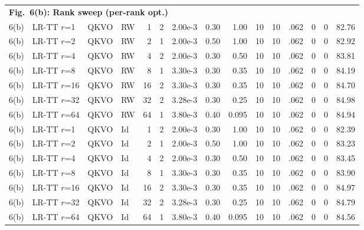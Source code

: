 \documentclass[AMA,LATO1COL]{WileyNJDv5}
\begin{document}
{\begin{longtable}{@{}l l l l r r r r r r r r r r r@{}}
\multicolumn{15}{l}{\cellcolor{HeadGray}\textbf{Fig.~6(b): Rank sweep (per-rank opt.)}} \\
6(b) & LR-TT $r$=1 & QKVO & RW & 1 & 2 & 2.00e-3 & 0.30 & 1.00 & 10 & 10 & .062 & 0 & 0 & 82.76 \\
6(b) & LR-TT $r$=2 & QKVO & RW & 2 & 1 & 2.00e-3 & 0.50 & 1.00 & 10 & 10 & .062 & 0 & 0 & 82.92 \\
6(b) & LR-TT $r$=4 & QKVO & RW & 4 & 2 & 2.00e-3 & 0.30 & 0.50 & 10 & 10 & .062 & 0 & 0 & 83.81 \\
6(b) & LR-TT $r$=8 & QKVO & RW & 8 & 1 & 3.30e-3 & 0.30 & 0.35 & 10 & 10 & .062 & 0 & 0 & 84.19 \\
6(b) & LR-TT $r$=16 & QKVO & RW & 16 & 2 & 3.30e-3 & 0.30 & 0.35 & 10 & 10 & .062 & 0 & 0 & 84.70 \\
6(b) & LR-TT $r$=32 & QKVO & RW & 32 & 2 & 3.28e-3 & 0.30 & 0.25 & 10 & 10 & .062 & 0 & 0 & 84.98 \\
6(b) & LR-TT $r$=64 & QKVO & RW & 64 & 1 & 3.80e-3 & 0.40 & 0.095 & 10 & 10 & .062 & 0 & 0 & 84.94 \\
6(b) & LR-TT $r$=1 & QKVO & Id & 1 & 2 & 2.00e-3 & 0.30 & 1.00 & 10 & 10 & .062 & 0 & 0 & 82.39 \\
6(b) & LR-TT $r$=2 & QKVO & Id & 2 & 1 & 2.00e-3 & 0.50 & 1.00 & 10 & 10 & .062 & 0 & 0 & 83.23 \\
6(b) & LR-TT $r$=4 & QKVO & Id & 4 & 2 & 2.00e-3 & 0.30 & 0.50 & 10 & 10 & .062 & 0 & 0 & 83.45 \\
6(b) & LR-TT $r$=8 & QKVO & Id & 8 & 1 & 3.30e-3 & 0.30 & 0.35 & 10 & 10 & .062 & 0 & 0 & 83.90 \\
6(b) & LR-TT $r$=16 & QKVO & Id & 16 & 2 & 3.30e-3 & 0.30 & 0.35 & 10 & 10 & .062 & 0 & 0 & 84.97 \\
6(b) & LR-TT $r$=32 & QKVO & Id & 32 & 2 & 3.28e-3 & 0.30 & 0.25 & 10 & 10 & .062 & 0 & 0 & 84.79 \\
6(b) & LR-TT $r$=64 & QKVO & Id & 64 & 1 & 3.80e-3 & 0.40 & 0.095 & 10 & 10 & .062 & 0 & 0 & 84.56 \\
\midrule


\end{longtable}}
\end{document}
